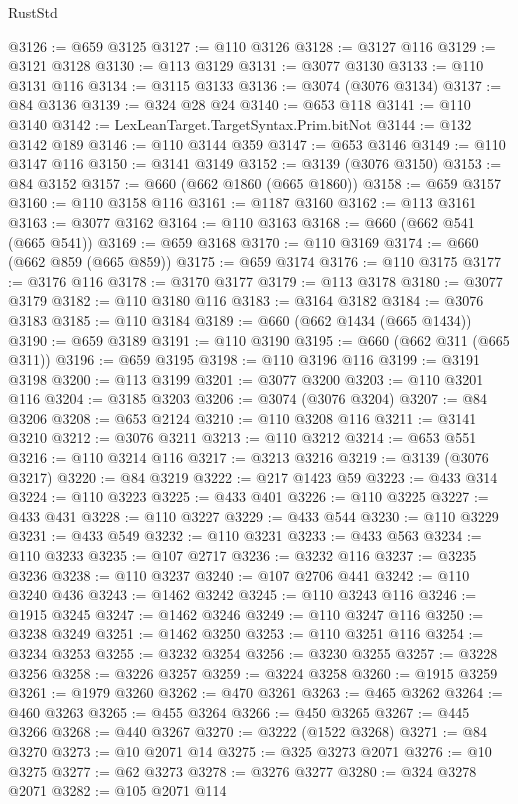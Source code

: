 \begin{lexlean}{RustStd}
\begin{coremodule}
@3126 := @659 @3125
@3127 := @110 @3126
@3128 := @3127 @116
@3129 := @3121 @3128
@3130 := @113 @3129
@3131 := @3077 @3130
@3133 := @110 @3131 @116
@3134 := @3115 @3133
@3136 := @3074 (@3076 @3134)
@3137 := @84 @3136
@3139 := @324 @28 @24
@3140 := @653 @118
@3141 := @110 @3140
@3142 := LexLeanTarget.TargetSyntax.Prim.bitNot
@3144 := @132 @3142 @189
@3146 := @110 @3144 @359
@3147 := @653 @3146
@3149 := @110 @3147 @116
@3150 := @3141 @3149
@3152 := @3139 (@3076 @3150)
@3153 := @84 @3152
@3157 := @660 (@662 @1860 (@665 @1860))
@3158 := @659 @3157
@3160 := @110 @3158 @116
@3161 := @1187 @3160
@3162 := @113 @3161
@3163 := @3077 @3162
@3164 := @110 @3163
@3168 := @660 (@662 @541 (@665 @541))
@3169 := @659 @3168
@3170 := @110 @3169
@3174 := @660 (@662 @859 (@665 @859))
@3175 := @659 @3174
@3176 := @110 @3175
@3177 := @3176 @116
@3178 := @3170 @3177
@3179 := @113 @3178
@3180 := @3077 @3179
@3182 := @110 @3180 @116
@3183 := @3164 @3182
@3184 := @3076 @3183
@3185 := @110 @3184
@3189 := @660 (@662 @1434 (@665 @1434))
@3190 := @659 @3189
@3191 := @110 @3190
@3195 := @660 (@662 @311 (@665 @311))
@3196 := @659 @3195
@3198 := @110 @3196 @116
@3199 := @3191 @3198
@3200 := @113 @3199
@3201 := @3077 @3200
@3203 := @110 @3201 @116
@3204 := @3185 @3203
@3206 := @3074 (@3076 @3204)
@3207 := @84 @3206
@3208 := @653 @2124
@3210 := @110 @3208 @116
@3211 := @3141 @3210
@3212 := @3076 @3211
@3213 := @110 @3212
@3214 := @653 @551
@3216 := @110 @3214 @116
@3217 := @3213 @3216
@3219 := @3139 (@3076 @3217)
@3220 := @84 @3219
@3222 := @217 @1423 @59
@3223 := @433 @314
@3224 := @110 @3223
@3225 := @433 @401
@3226 := @110 @3225
@3227 := @433 @431
@3228 := @110 @3227
@3229 := @433 @544
@3230 := @110 @3229
@3231 := @433 @549
@3232 := @110 @3231
@3233 := @433 @563
@3234 := @110 @3233
@3235 := @107 @2717
@3236 := @3232 @116
@3237 := @3235 @3236
@3238 := @110 @3237
@3240 := @107 @2706 @441
@3242 := @110 @3240 @436
@3243 := @1462 @3242
@3245 := @110 @3243 @116
@3246 := @1915 @3245
@3247 := @1462 @3246
@3249 := @110 @3247 @116
@3250 := @3238 @3249
@3251 := @1462 @3250
@3253 := @110 @3251 @116
@3254 := @3234 @3253
@3255 := @3232 @3254
@3256 := @3230 @3255
@3257 := @3228 @3256
@3258 := @3226 @3257
@3259 := @3224 @3258
@3260 := @1915 @3259
@3261 := @1979 @3260
@3262 := @470 @3261
@3263 := @465 @3262
@3264 := @460 @3263
@3265 := @455 @3264
@3266 := @450 @3265
@3267 := @445 @3266
@3268 := @440 @3267
@3270 := @3222 (@1522 @3268)
@3271 := @84 @3270
@3273 := @10 @2071 @14
@3275 := @325 @3273 @2071
@3276 := @10 @3275
@3277 := @62 @3273
@3278 := @3276 @3277
@3280 := @324 @3278 @2071
@3282 := @105 @2071 @114

\end{coremodule}
\end{lexlean}

